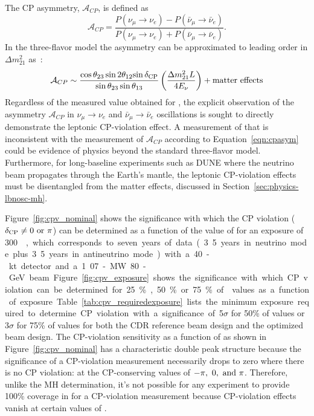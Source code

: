 The CP asymmetry,
$\mathcal{A}_{CP}$, is defined as 
\begin{equation}
\label{eqn:cp-asymm}
 \mathcal{A}_{CP} = \frac{P(\nu_\mu \rightarrow \nu_e) -
  P(\bar{\nu}_\mu \rightarrow \bar{\nu}_e)}{P(\nu_\mu \rightarrow
  \nu_e) + P(\bar{\nu}_\mu \rightarrow \bar{\nu}_e)}.
\end{equation}
In the three-flavor model the asymmetry can be approximated to leading
order in $\Delta m_{21}^2$ as~\cite{Marciano:2006uc}:
\begin{equation}
\mathcal{A}_{CP} \sim \frac{\cos \theta_{23} \sin 2 \theta_{12}
  {\sin \delta_{\rm CP}}}{\sin \theta_{23} \sin \theta_{13}}
\left(\frac{\Delta m^2_{21} L}{ 4 E_{\nu}}\right) + {\rm matter
  \ effects}
\label{eqn:cpasym}
\end{equation}
Regardless of the measured value obtained for \deltacp, the explicit
observation of the asymmetry $\mathcal{A}_{CP}$ in $\nu_{\mu}
\rightarrow \nu_e$ and $\bar{\nu}_{\mu} \rightarrow
\bar{\nu}_e$ oscillations is sought to directly demonstrate the
leptonic CP-violation effect.  A measurement of \deltacp that is
inconsistent with the measurement of $\mathcal{A}_{CP}$ according to
Equation~\ref{eqn:cpasym} could be evidence of physics beyond the
standard three-flavor model.  Furthermore, for long-baseline
experiments such as DUNE where the neutrino beam propagates through
the Earth's mantle, the leptonic CP-violation effects must be
disentangled from the matter effects, discussed in
Section~\ref{sec:physics-lbnosc-mh}.

Figure~\ref{fig:cpv_nominal} shows the significance with which the CP
violation ($\delta_{\rm CP} \neq 0 \ {\rm or} \ \pi$) can be determined as a
function of the value of \deltacp for an exposure of \SI{300}~\ktMWyr,
which corresponds to seven years of data (3.5 years in neutrino mode
plus 3.5 years in antineutrino mode) with a 40-kt detector and a
1.07-MW 80-GeV beam.  Figure~\ref{fig:cpv_exposure} shows the significance
with which CP violation can be determined for 25\%, 50\% or 75\% of \deltacp
values as a function of exposure.
Table~\ref{tab:cpv_requiredexposure} lists the minimum exposure
required to determine CP violation with a significance of 5$\sigma$
for 50\% of \deltacp values or 3$\sigma$ for 75\% of \deltacp values
for both the CDR reference beam design and the optimized beam design.
The CP-violation sensitivity as a function of \deltacp as shown in
Figure~\ref{fig:cpv_nominal} has a characteristic double peak
structure because the significance of a CP-violation measurement
necessarily drops to zero where there is no CP violation: at the
CP-conserving values of $-\pi,~0,~{\rm and}~\pi$.  Therefore, unlike
the MH determination, it's not possible for any experiment to provide
100\% coverage in \deltacp for a CP-violation measurement because CP-violation effects vanish at certain values of \deltacp.


